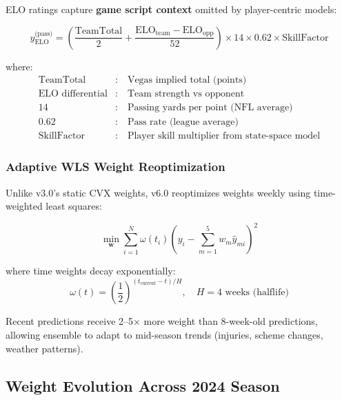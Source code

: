 ELO ratings capture \textbf{game script context} omitted by player-centric models:

\begin{equation}
\hat{y}_{\text{ELO}}^{\text{(pass)}} = \left( \frac{\text{TeamTotal}}{2} + \frac{\text{ELO}_{\text{team}} - \text{ELO}_{\text{opp}}}{52} \right) \times 14 \times 0.62 \times \text{SkillFactor}
\label{eq:elo-component}
\end{equation}

where:
\begin{align}
\text{TeamTotal} &: \quad \text{Vegas implied total (points)} \\
\text{ELO differential} &: \quad \text{Team strength vs opponent} \\
14 &: \quad \text{Passing yards per point (NFL average)} \\
0.62 &: \quad \text{Pass rate (league average)} \\
\text{SkillFactor} &: \quad \text{Player skill multiplier from state-space model}
\end{align}

\subsubsection{Adaptive WLS Weight Reoptimization}

Unlike v3.0's static CVX weights, v6.0 reoptimizes weights weekly using time-weighted least squares:

\begin{equation}
\min_{\mathbf{w}} \sum_{i=1}^{N} \omega(t_i) \left( y_i - \sum_{m=1}^{5} w_m \hat{y}_{mi} \right)^2
\label{eq:adaptive-wls}
\end{equation}

where time weights decay exponentially:
\begin{equation}
\omega(t) = \left( \frac{1}{2} \right)^{(t_{\text{current}} - t) / H}, \quad H = 4 \text{ weeks (halflife)}
\end{equation}

Recent predictions receive 2--5× more weight than 8-week-old predictions, allowing ensemble to adapt to mid-season trends (injuries, scheme changes, weather patterns).

\subsection{Weight Evolution Across 2024 Season}

